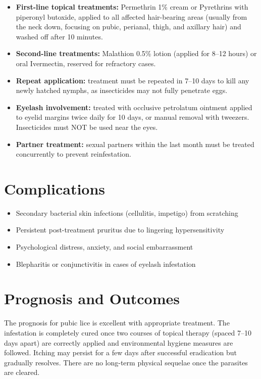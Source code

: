 \begin{itemize}
    \item \textbf{First-line topical treatments:} Permethrin 1\% cream or Pyrethrins with piperonyl butoxide, applied to all affected hair-bearing areas (usually from the neck down, focusing on pubic, perianal, thigh, and axillary hair) and washed off after 10 minutes.
    \item \textbf{Second-line treatments:} Malathion 0.5\% lotion (applied for 8--12 hours) or oral Ivermectin, reserved for refractory cases.
    \item \textbf{Repeat application:} treatment must be repeated in 7--10 days to kill any newly hatched nymphs, as insecticides may not fully penetrate eggs.
    \item \textbf{Eyelash involvement:} treated with occlusive petrolatum ointment applied to eyelid margins twice daily for 10 days, or manual removal with tweezers. Insecticides must NOT be used near the eyes.
    \item \textbf{Partner treatment:} sexual partners within the last month must be treated concurrently to prevent reinfestation.
\end{itemize}

\section*{Complications}
\begin{itemize}
    \item Secondary bacterial skin infections (cellulitis, impetigo) from scratching
    \item Persistent post-treatment pruritus due to lingering hypersensitivity
    \item Psychological distress, anxiety, and social embarrassment
    \item Blepharitis or conjunctivitis in cases of eyelash infestation
\end{itemize}

\section*{Prognosis and Outcomes}
The prognosis for pubic lice is excellent with appropriate treatment. The infestation is completely cured once two courses of topical therapy (spaced 7--10 days apart) are correctly applied and environmental hygiene measures are followed. Itching may persist for a few days after successful eradication but gradually resolves. There are no long-term physical sequelae once the parasites are cleared.

